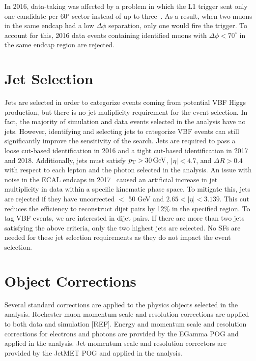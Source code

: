 In 2016, data-taking was affected by a problem in which the L1 trigger sent only one candidate per 60$^{\circ}$ sector instead 
of up to three~\cite{twiki:l1emtf}. As a result, when two muons in the same endcap had a low $\Delta \phi$ separation, only one would fire the 
trigger. To account for this, 2016 data events containing identified muons with $\Delta \phi < 70^{\circ}$ in the same endcap region 
are rejected. 


\section{Jet Selection}
Jets are selected in order to categorize events coming from potential VBF Higgs production, but there is no jet muliplicity requirement 
for the \hzg{} event selection. In fact, the majority of simulation and data events selected in the analysis have no jets. However, identifying 
and selecting jets to categorize VBF events can still significantly improve the sensitivity of the search. Jets are required to pass 
a loose cut-based identification in 2016 and a tight cut-based identification in 2017 and 2018. 
Additionally, jets must satisfy $p_{\mathrm{T}}>30\,\text{Ge\hspace{-.08em}V}$, $|\eta| < 4.7$, and $\Delta R > 0.4$ with 
respect to each lepton and the photon selected in the analysis. An issue with noise in the ECAL endcaps in 2017~\cite{eenoise} caused an artificial 
increase in jet multiplicity in data within a specific kinematic phase space. To mitigate this, jets are rejected if they have 
uncorrected \pt $<$ 50 GeV and $2.65 < |\eta| < 3.139$. This cut reduces the efficiency to reconstruct dijet pairs by 12\% in the specified 
region. To tag VBF events, we are interested in dijet pairs. If there are more than two jets satisfying the above criteria, 
only the two highest \pt jets are selected. No SFs are needed for these jet selection requirements as they do not impact the event selection.

\section{Object Corrections}
Several standard corrections are applied to the physics objects selected in the analysis. Rochester muon momentum scale and resolution 
corrections are applied to both data and simulation [REF]. Energy and momentum scale and resolution corrections for electrons 
and photons are provided by the EGamma POG and applied in the analysis. Jet momentum scale and resolution correctors are provided by 
the JetMET POG and applied in the analysis. 

